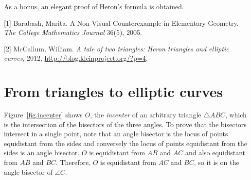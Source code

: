 \documentclass[11pt,a4paper]{article}
\begin{document}
As a bonus, an elegant proof of Heron's formula is obtained.

[1] Barabash, Marita. A Non-Visual Counterexample in Elementary Geometry. \textit{The College Mathematics Journal} 36(5), 2005.

[2] McCallum, William. \textit{A tale of two triangles: Heron triangles and elliptic curves}, 2012, \url{http://blog.kleinproject.org/?p=4}.

\section{From triangles to elliptic curves}

Figure~\ref{fig.incenter} shows $O$, the \emph{incenter} of an arbitrary triangle $\triangle ABC$, which is the intersection of the bisectors of the three angles. To prove that the bisectors intersect in a single point, note that an angle bisector is the locus of points equidistant from the sides and conversely the locus of points equidistant from the sides is an angle bisector. $O$ is equidistant from $AB$ and $AC$ and also equidistant from $AB$ and $BC$. Therefore, $O$ is equidistant from $AC$ and $BC$, so it is on the angle bisector of $\angle C$.

\vspace*{-6ex}
\end{document}

